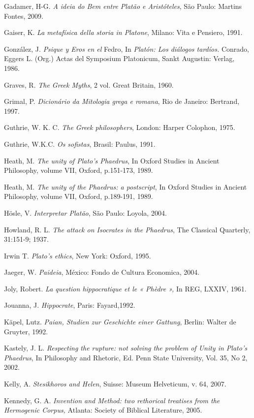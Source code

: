 Gadamer, H-G. \emph{A ideia do Bem entre Platão e Aristóteles}, São
Paulo: Martins Fontes, 2009.

Gaiser, K. \emph{La metafísica della storia in Platone}, Milano: Vita e
Pensiero, 1991.

González, J. \emph{Psique y Eros en el} Fedro, In \emph{Platón: Los
diálogos tardíos.} Conrado, Eggers L. (Org.) Actas del Symposium
Platonicum, Sankt Augustin: Verlag, 1986.

Graves, R. \emph{The Greek Myths}, 2 vol. Great Britain, 1960.

Grimal, P. \emph{Dicionário da Mitologia grega e romana}, Rio de
Janeiro: Bertrand, 1997.

Guthrie, W. K. C. \emph{The Greek philosophers}, London: Harper
Colophon, 1975.

Guthrie, W.K.C. \emph{Os sofistas}, Brasil: Paulus, 1991.

Heath, M. \emph{The unity of Plato's Phaedrus}, In Oxford Studies in
Ancient Philosophy, volume VII, Oxford, p.151-173, 1989.

Heath, M. \emph{The unity of the Phaedrus: a postscript}, In Oxford
Studies in Ancient Philosophy, volume VII, Oxford, p.189-191, 1989.

Hösle, V. \emph{Interpretar Platão}, São Paulo: Loyola, 2004.

Howland, R. L. \emph{The attack on Isocrates in the Phaedrus}, The
Classical Quarterly, 31:151-9; 1937.

Irwin T. \emph{Plato's ethics}, New York: Oxford, 1995.

Jaeger, W. \emph{Paideia}, México: Fondo de Cultura Economica, 2004.

Joly, Robert. \emph{La question hippocratique et le « Phèdre »,} In REG,
LXXIV, 1961.

Jouanna, J. \emph{Hippocrate}, Paris: Fayard,1992.

Käpel, Lutz. \emph{Paian, Studien zur Geschichte einer Gattung}, Berlin:
Walter de Gruyter, 1992.

Kastely, J. L. \emph{Respecting the rupture: not solving the problem of
Unity in Plato's Phaedrus}, In Philosophy and Rhetoric, Ed. Penn State
University, Vol. 35, No 2, 2002.

Kelly, A. \emph{Stesikhoros and Helen}, Suisse: Museum Helveticum, v.
64, 2007.

Kennedy, G. A. \emph{Invention and Method: two rethorical treatises from
the Hermogenic Corpus,} Atlanta: Society of Biblical Literature, 2005.

